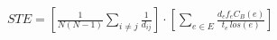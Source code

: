$STE=\left[\frac{1}{N(N-1)}\sum_{i\ne j}\frac{1}{d_{ij}}\right]\cdot
    \left[\sum_{e\in E}\frac{d_e f_e C_B(e)}{t_e\,los(e)}\right]$